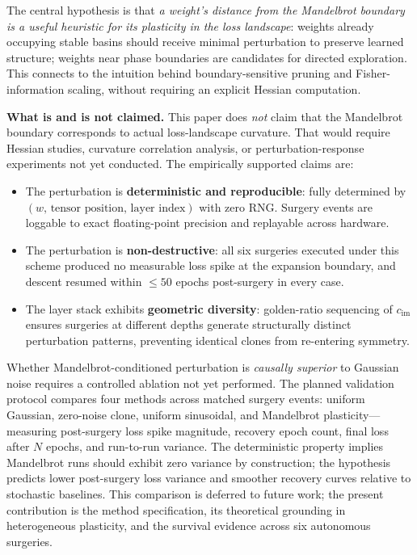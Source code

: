 \documentclass[11pt,a4paper]{article}
\begin{document}
The central hypothesis is that \emph{a weight's distance from the Mandelbrot
boundary is a useful heuristic for its plasticity in the loss landscape}:
weights already occupying stable basins should receive minimal perturbation to
preserve learned structure; weights near phase boundaries are candidates for
directed exploration. This connects to the intuition behind boundary-sensitive
pruning and Fisher-information scaling, without requiring an explicit Hessian
computation.

\textbf{What is and is not claimed.}
This paper does \emph{not} claim that the Mandelbrot boundary corresponds to
actual loss-landscape curvature. That would require Hessian studies, curvature
correlation analysis, or perturbation-response experiments not yet conducted.
The empirically supported claims are:

\begin{itemize}
  \item The perturbation is \textbf{deterministic and reproducible}: fully
        determined by $(w,\, \text{tensor position},\, \text{layer index})$
        with zero RNG. Surgery events are loggable to exact floating-point
        precision and replayable across hardware.
  \item The perturbation is \textbf{non-destructive}: all six surgeries
        executed under this scheme produced no measurable loss spike at the
        expansion boundary, and descent resumed within $\leq 50$ epochs
        post-surgery in every case.
  \item The layer stack exhibits \textbf{geometric diversity}: golden-ratio
        sequencing of $c_\text{im}$ ensures surgeries at different depths
        generate structurally distinct perturbation patterns, preventing
        identical clones from re-entering symmetry.
\end{itemize}

Whether Mandelbrot-conditioned perturbation is \emph{causally superior} to
Gaussian noise requires a controlled ablation not yet performed. The planned
validation protocol compares four methods across matched surgery events:
uniform Gaussian, zero-noise clone, uniform sinusoidal, and Mandelbrot
plasticity---measuring post-surgery loss spike magnitude, recovery epoch count,
final loss after $N$ epochs, and run-to-run variance. The deterministic property
implies Mandelbrot runs should exhibit zero variance by construction; the
hypothesis predicts lower post-surgery loss variance and smoother recovery
curves relative to stochastic baselines. This comparison is deferred to future
work; the present contribution is the method specification, its theoretical
grounding in heterogeneous plasticity, and the survival evidence across six
autonomous surgeries.
\end{document}
